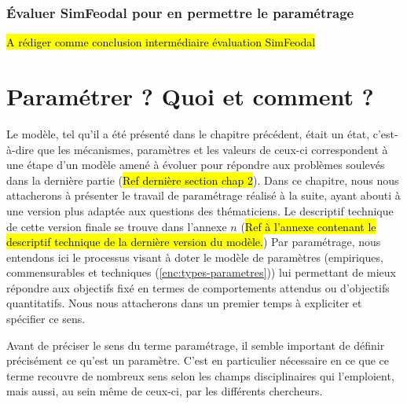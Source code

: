 
\subsubsection{Évaluer SimFeodal pour en permettre le paramétrage}

\begin{center}
	\hl{A rédiger comme conclusion intermédiaire évaluation SimFeodal}
\end{center}

\section{Paramétrer ? Quoi et comment ?}

Le modèle, tel qu'il a été présenté dans le chapitre précédent, était un \og état\fg{}, c'est-à-dire que les mécanismes, paramètres et les valeurs de ceux-ci correspondent à une étape d'un modèle amené à évoluer pour répondre aux problèmes soulevés dans la dernière partie (\hl{Ref dernière section chap 2}).
Dans ce chapitre, nous nous attacherons à présenter le travail de paramétrage réalisé à la suite, ayant abouti à une version plus adaptée aux questions des thématiciens. Le descriptif technique de cette version \og finale\fg{} se trouve dans l'annexe $n$ (\hl{Ref à l'annexe contenant le descriptif technique de la dernière version du modèle.})
Par paramétrage, nous entendons ici le processus visant à doter le modèle de paramètres (empiriques, \og commensurables\fg{} et techniques (\cref{enc:types-parametres})) lui permettant de mieux répondre aux objectifs fixé en termes de comportements attendus ou d'objectifs quantitatifs. Nous nous attacherons dans un premier temps à expliciter et spécifier ce sens.


Avant de préciser le sens du terme \og paramétrage\fg{}, il semble important de définir précisément ce qu'est un paramètre. C'est en particulier nécessaire en ce que ce terme recouvre de nombreux sens selon les champs disciplinaires qui l'emploient, mais aussi, au sein même de ceux-ci, par les différents chercheurs.

